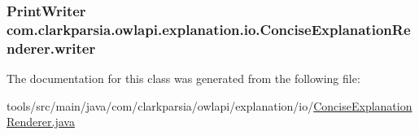 \hypertarget{classcom_1_1clarkparsia_1_1owlapi_1_1explanation_1_1io_1_1_concise_explanation_renderer_a4b990bdd27662df2c81700e17eb795b4}{
\subsubsection[{writer}]{\setlength{\rightskip}{0pt plus 5cm}Print\-Writer com.\-clarkparsia.\-owlapi.\-explanation.\-io.\-Concise\-Explanation\-Renderer.\-writer\hspace{0.3cm}{\ttfamily [private]}}}\label{classcom_1_1clarkparsia_1_1owlapi_1_1explanation_1_1io_1_1_concise_explanation_renderer_a4b990bdd27662df2c81700e17eb795b4}


The documentation for this class was generated from the following file\-:\begin{DoxyCompactItemize}
\item 
tools/src/main/java/com/clarkparsia/owlapi/explanation/io/\hyperlink{_concise_explanation_renderer_8java}{Concise\-Explanation\-Renderer.\-java}\end{DoxyCompactItemize}
